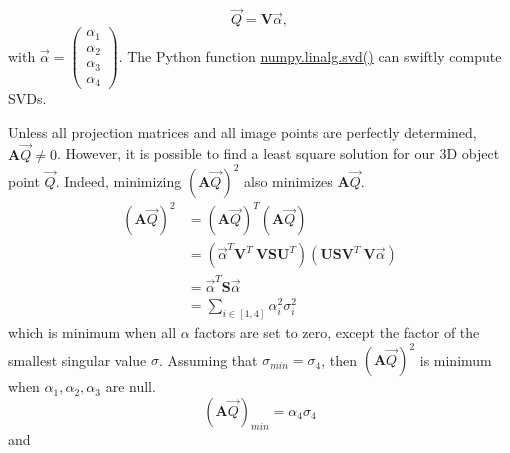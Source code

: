 \begin{algorithm}[!ht]
\begin{algorithmic}[1]
      \begin{equation}
        \overrightarrow{Q} = \textbf{V} \overrightarrow{\alpha},
      \end{equation}
      with \(\overrightarrow{\alpha} = \begin{pmatrix}\alpha_1 \\\alpha_2 \\\alpha_3 \\\alpha_4\end{pmatrix}\). The Python function \href{https://numpy.org/doc/stable/reference/generated/numpy.linalg.svd.html}{numpy.linalg.svd()} can swiftly compute SVDs. 
    \end{algorithmic}
\end{algorithm}

\begin{algorithm}
      \begin{algorithmic}[1]
      \STATE Unless all projection matrices and all image points are perfectly determined, \(\textbf{A}\overrightarrow{Q} \neq 0\). However, it is possible to find a least square solution for our 3D object point \(\overrightarrow{Q}\). Indeed, minimizing \((\textbf{A}\overrightarrow{Q})^2\) also minimizes \(\textbf{A}\overrightarrow{Q}\).
      \begin{equation}
          \begin{aligned}
          (\textbf{A}\overrightarrow{Q})^2 & = (\textbf{A} \overrightarrow{Q})^T (\textbf{A} \overrightarrow{Q})\\
          & = (\overrightarrow{\alpha}^T \textbf{V}^T \ \textbf{V} \textbf{S} \textbf{U}^T)(\textbf{U} \textbf{S} \textbf{V}^T \ \textbf{V}\overrightarrow{\alpha})\\
          & = \overrightarrow{\alpha}^T \textbf{S} \overrightarrow{\alpha}\\
          & = \sum_{i \in [1,4]} \alpha_i^2 \sigma_i^2
          \end{aligned}
      \end{equation}
      which is minimum when all \(\alpha\) factors are set to zero, except the factor of the smallest singular value \(\sigma\). 
      \STATE Assuming that \(\sigma_{min} = \sigma_4\), then \((\textbf{A}\overrightarrow{Q})^2\) is minimum when \(\alpha_1, \alpha_2, \alpha_3\) are null.
      \begin{equation}
          (\textbf{A} \overrightarrow{Q})_{min} = \alpha_4 \sigma_4
      \end{equation}
      and 
      \begin{equation}

\end{equation}
\end{algorithmic}
\end{algorithm}
